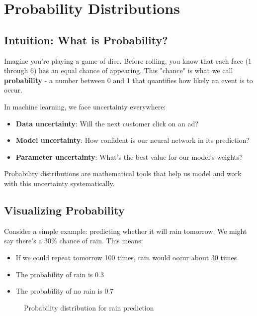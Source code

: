 
\section{Probability Distributions}
\label{sec:probability-distributions}

\subsection{Intuition: What is Probability?}

Imagine you're playing a game of dice. Before rolling, you know that each face (1 through 6) has an equal chance of appearing. This "chance" is what we call \textbf{probability} - a number between 0 and 1 that quantifies how likely an event is to occur.

In machine learning, we face uncertainty everywhere:
\begin{itemize}
    \item \textbf{Data uncertainty}: Will the next customer click on an ad?
    \item \textbf{Model uncertainty}: How confident is our neural network in its prediction?
    \item \textbf{Parameter uncertainty}: What's the best value for our model's weights?
\end{itemize}

Probability distributions are mathematical tools that help us model and work with this uncertainty systematically.

\subsection{Visualizing Probability}

Consider a simple example: predicting whether it will rain tomorrow. We might say there's a 30\% chance of rain. This means:
\begin{itemize}
    \item If we could repeat tomorrow 100 times, rain would occur about 30 times
    \item The probability of rain is 0.3
    \item The probability of no rain is 0.7
\end{itemize}

\begin{figure}[h]
\centering
{}
\caption{Probability distribution for rain prediction}
\label{fig:rain-probability}
\end{figure}

